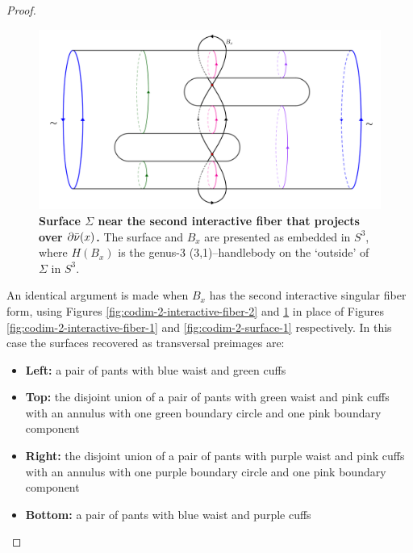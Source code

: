 \begin{proof}
	\begin{figure}[h!]
		\centering
		\includegraphics[width=\textwidth]{figures/codim-2-surface-2.png}
		\caption{
			\textbf{Surface $\Sigma$ near the second interactive fiber that projects over $\partial\bar\nu(x)$.}
			The surface and $B_x$ are presented as embedded in $S^3$, where $H(B_x)$ is the genus-3 (3,1)--handlebody on the `outside' of $\Sigma$ in $S^3$.
		}
		\label{fig:codim-2-surface-2}
	\end{figure}

	An identical argument is made when $B_x$ has the second interactive singular fiber form, using Figures \ref{fig:codim-2-interactive-fiber-2} and \ref{fig:codim-2-surface-2} in place of Figures \ref{fig:codim-2-interactive-fiber-1} and \ref{fig:codim-2-surface-1} respectively.
	In this case the surfaces recovered as transversal preimages are:
	{\renewcommand\labelitemi{}
	\begin{itemize}
		\item \textbf{Left:} a pair of pants with blue waist and green cuffs
		\item \textbf{Top:} the disjoint union of a pair of pants with green waist and pink cuffs with an annulus with one green boundary circle and one pink boundary component
		\item \textbf{Right:} the disjoint union of a pair of pants with purple waist and pink cuffs with an annulus with one purple boundary circle and one pink boundary component
		\item \textbf{Bottom:} a pair of pants with blue waist and purple cuffs
	\end{itemize}
	}
	




\end{proof}
